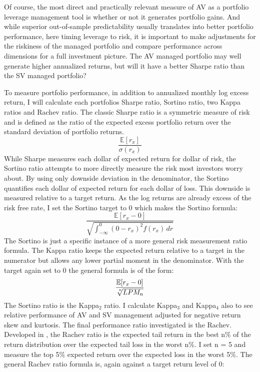 Of course, the most direct and practically relevant measure of AV as a portfolio leverage management tool is whether or not it generates portfolio gains. And while superior out-of-sample predictability usually translates into better portfolio performance, here timing leverage to risk, it is important to make adjustments for the riskiness of the managed portfolio and compare performance across dimensions for a full investment picture. The AV managed portfolio may well generate higher annualized returns, but will it have a better Sharpe ratio than the SV managed portfolio?

To measure portfolio performance, in addition to annualized monthly log excess return, I will calculate each portfolios Sharpe ratio, Sortino ratio, two Kappa ratios and Rachev ratio. The classic Sharpe ratio is a symmetric measure of risk and is defined as the ratio of the expected excess portfolio return over the standard deviation of portfolio returns.
\begin{equation}
	\frac{\mathbb{E}[r_{x}]}{\sigma(r_{x})}
\end{equation}
While Sharpe measures each dollar of expected return for dollar of risk, the Sortino ratio attempts to more directly measure the risk most investors worry about. By using only downside deviation in the denominator, the Sortino quantifies each dollar of expected return for each dollar of loss. This downside is measured relative to a target return. \citep{sortino_performance_1994} As the log returns are already excess of the risk free rate, I set the Sortino target to 0 which makes the Sortino formula:
\begin{equation}
	\frac{\mathbb{E}[r_{x} - 0]}{\sqrt  {\int _{{-\infty }}^{0}(0-r_{x})^{2}f(r_{x})\,dr}}
\end{equation}
The Sortino is just a specific instance of a more general risk measurement ratio formula. The Kappa ratio keeps the expected return relative to a target in the numerator but allows any lower partial moment in the denominator. \citep{kaplan_kappa:_2004} With the target again set to 0 the general formula is of the form:
\begin{equation}
\frac{\mathbb{E}[r_{x} - 0]}{\sqrt[\leftroot{-2}\uproot{2}n]{LPM_{n}}} 
\end{equation}
The Sortino ratio is the Kappa$_{2}$ ratio. I calculate Kappa$_{3}$ and Kappa$_{4}$ also to see relative performance of AV and SV management adjusted for negative return skew and kurtosis. The final performance ratio investigated is the Rachev. Developed in \citet{biglova_different_2004}, the Rachev ratio is the expected tail return in the best n\% of the return distribution over the expected tail loss in the worst n\%. I set n = 5 and measure the top 5\% expected return over the expected loss in the worst 5\%. The general Rachev ratio formula is, again against a target return level of 0:
